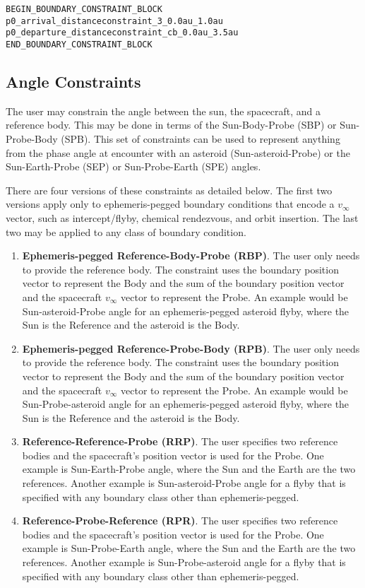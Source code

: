 \documentclass[11pt]{article}
\begin{document}
\begin{verbatim}
BEGIN_BOUNDARY_CONSTRAINT_BLOCK
p0_arrival_distanceconstraint_3_0.0au_1.0au
p0_departure_distanceconstraint_cb_0.0au_3.5au
END_BOUNDARY_CONSTRAINT_BLOCK
\end{verbatim}

\subsection{Angle Constraints}
\label{subsec:boundaryAngleConstraint}

The user may constrain the angle between the sun, the spacecraft, and a reference body. This may be done in terms of the Sun-Body-Probe (SBP) or Sun-Probe-Body (SPB). This set of constraints can be used to represent anything from the phase angle at encounter with an asteroid (Sun-asteroid-Probe) or the Sun-Earth-Probe (SEP) or Sun-Probe-Earth (SPE) angles.

There are four versions of these constraints as detailed below. The first two versions apply only to ephemeris-pegged boundary conditions that encode a $v_\infty$ vector, such as intercept/flyby, chemical rendezvous, and orbit insertion. The last two may be applied to any class of boundary condition.

\begin{enumerate}
	\item \textbf{Ephemeris-pegged Reference-Body-Probe (RBP)}. The user only needs to provide the reference body. The constraint uses the boundary position vector to represent the Body and the sum of the boundary position vector and the spacecraft $v_\infty$ vector to represent the Probe. An example would be Sun-asteroid-Probe angle for an ephemeris-pegged asteroid flyby, where the Sun is the Reference and the asteroid is the Body.
	\item \textbf{Ephemeris-pegged Reference-Probe-Body (RPB)}. The user only needs to provide the reference body. The constraint uses the boundary position vector to represent the Body and the sum of the boundary position vector and the spacecraft $v_\infty$ vector to represent the Probe. An example would be Sun-Probe-asteroid angle for an ephemeris-pegged asteroid flyby, where the Sun is the Reference and the asteroid is the Body.
	\item \textbf{Reference-Reference-Probe (RRP)}. The user specifies two reference bodies and the spacecraft's position vector is used for the Probe. One example is Sun-Earth-Probe angle, where the Sun and the Earth are the two references. Another example is Sun-asteroid-Probe angle for a flyby that is specified with any boundary class other than ephemeris-pegged.
	\item \textbf{Reference-Probe-Reference (RPR)}. The user specifies two reference bodies and the spacecraft's position vector is used for the Probe. One example is Sun-Probe-Earth angle, where the Sun and the Earth are the two references. Another example is Sun-Probe-asteroid angle for a flyby that is specified with any boundary class other than ephemeris-pegged.
\end{enumerate}
\end{document}
